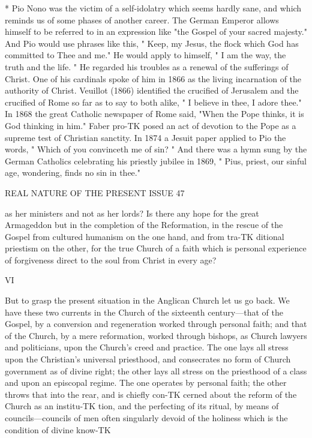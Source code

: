 \documentclass[12pt,a5paper,oneside]{book}
\begin{document}
* Pio Nono was the victim of a self-idolatry which seems hardly 
sane, and which reminds us of some phases of another career. The 
German Emperor allows himself to be referred to in an expression 
like "the Gospel of your sacred majesty." And Pio would use 
phrases like this, " Keep, my Jesus, the flock which God has 
committed to Thee and me." He would apply to himself, " I am 
the way, the truth and the life. " He regarded his troubles as a 
renewal of the sufferings of Christ. One of his cardinals spoke of 
him in 1866 as the living incarnation of the authority of Christ. 
Veuillot (1866) identified the crucified of Jerusalem and the crucified 
of Rome so far as to say to both alike, " I believe in thee, I adore 
thee." In 1868 the great Catholic newspaper of Rome said, 
"When the Pope thinks, it is God thinking in him." Faber pro-TK
posed an act of devotion to the Pope as a supreme test of Christian 
sanctity. In 1874 a Jesuit paper applied to Pio the words, " Which 
of you convinceth me of sin? " And there was a hymn sung by the 
German Catholics celebrating his priestly jubilee in 1869, " Pius, 
priest, our sinful age, wondering, finds no sin in thee." 



REAL NATURE OF THE PRESENT ISSUE 47 

as her ministers and not as her lords? Is there any 
hope for the great Armageddon but in the completion 
of the Reformation, in the rescue of the Gospel from 
cultured humanism on the one hand, and from tra-TK
ditional priestism on the other, for the true Church of 
a faith which is personal experience of forgiveness 
direct to the soul from Christ in every age? 



VI 



But to grasp the present situation in the Anglican 
Church let us go back. We have these two currents 
in the Church of the sixteenth century---that of the 
Gospel, by a conversion and regeneration worked 
through personal faith; and that of the Church, by a 
mere reformation, worked through bishops, as Church 
lawyers and politicians, upon the Church's creed and 
practice. The one lays all stress upon the Christian's 
universal priesthood, and consecrates no form of 
Church government as of divine right; the other lays 
all stress on the priesthood of a class and upon an 
episcopal regime. The one operates by personal faith; 
the other throws that into the rear, and is chiefly con-TK
cerned about the reform of the Church as an institu-TK
tion, and the perfecting of its ritual, by means of 
councils---councils of men often singularly devoid of 
the holiness which is the condition of divine know-TK
\end{document}

